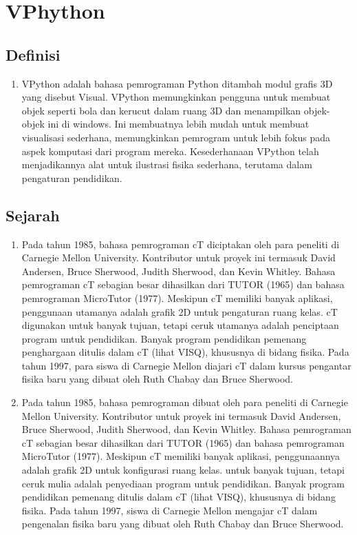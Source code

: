 

\section{VPhython}
\subsection{Definisi}
		\begin{enumerate}
			\item VPython adalah bahasa pemrograman Python ditambah modul grafis 3D yang disebut Visual. VPython memungkinkan pengguna untuk membuat objek seperti bola dan kerucut dalam ruang 3D dan menampilkan objek-objek ini di windows. Ini membuatnya lebih mudah untuk membuat visualisasi sederhana, memungkinkan pemrogram untuk lebih fokus pada aspek komputasi dari program mereka. Kesederhanaan VPython telah menjadikannya alat untuk ilustrasi fisika sederhana, terutama dalam pengaturan pendidikan.
		\end{enumerate}
\subsection{Sejarah}
		\begin{enumerate}
			\item Pada tahun 1985, bahasa pemrograman cT diciptakan oleh para peneliti di Carnegie Mellon University. Kontributor untuk proyek ini termasuk David Andersen, Bruce Sherwood, Judith Sherwood, dan Kevin Whitley. Bahasa pemrograman cT sebagian besar dihasilkan dari TUTOR (1965) dan bahasa pemrograman MicroTutor (1977). Meskipun cT memiliki banyak aplikasi, penggunaan utamanya adalah grafik 2D untuk pengaturan ruang kelas. cT digunakan untuk banyak tujuan, tetapi ceruk utamanya adalah penciptaan program untuk pendidikan. Banyak program pendidikan pemenang penghargaan ditulis dalam cT (lihat VISQ), khususnya di bidang fisika. Pada tahun 1997, para siswa di Carnegie Mellon diajari cT dalam kursus pengantar fisika baru yang dibuat oleh Ruth Chabay dan Bruce Sherwood.
			\item Pada tahun 1985, bahasa pemrograman dibuat oleh para peneliti di Carnegie Mellon University. Kontributor untuk proyek ini termasuk David Andersen, Bruce Sherwood, Judith Sherwood, dan Kevin Whitley. Bahasa pemrograman cT sebagian besar dihasilkan dari TUTOR (1965) dan bahasa pemrograman MicroTutor (1977). Meskipun cT memiliki banyak aplikasi, penggunaannya adalah grafik 2D untuk konfigurasi ruang kelas. untuk banyak tujuan, tetapi ceruk mulia adalah penyediaan program untuk pendidikan. Banyak program pendidikan pemenang ditulis dalam cT (lihat VISQ), khususnya di bidang fisika. Pada tahun 1997, siswa di Carnegie Mellon mengajar cT dalam pengenalan fisika baru yang dibuat oleh Ruth Chabay dan Bruce Sherwood.
		\end{enumerate}
